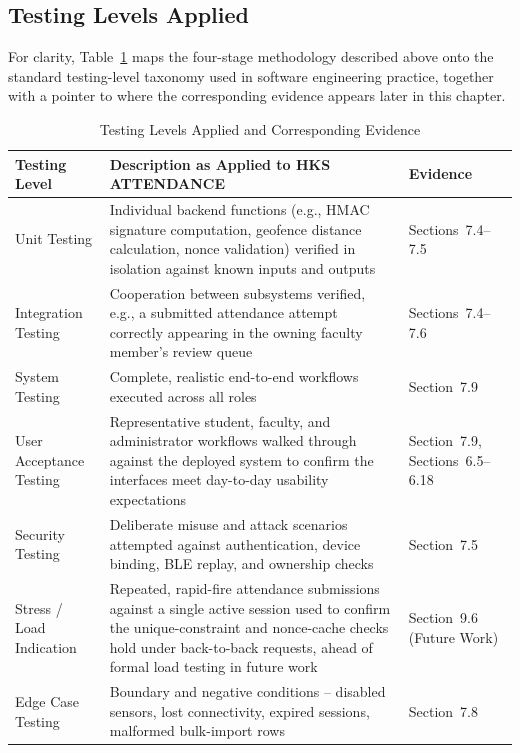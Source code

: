 \documentclass[12pt, a4paper, oneside]{report}
\begin{document}
\subsection{Testing Levels Applied}
\label{sec:testing-levels}

For clarity, Table~\ref{tab:testing-levels} maps the four-stage methodology described above onto the standard testing-level taxonomy used in software engineering practice, together with a pointer to where the corresponding evidence appears later in this chapter.

\begin{table}[p]
\centering
\caption{Testing Levels Applied and Corresponding Evidence}
\label{tab:testing-levels}
\tiny
\setlength{\tabcolsep}{3pt}
\renewcommand{\arraystretch}{1.05}
\begin{tabularx}{\textwidth}{|p{2.6cm}|X|p{2.6cm}|}
\hline
\textbf{Testing Level} & \textbf{Description as Applied to HKS ATTENDANCE} & \textbf{Evidence} \\
\hline
Unit Testing & Individual backend functions (e.g., HMAC signature computation, geofence distance calculation, nonce validation) verified in isolation against known inputs and outputs & Sections~7.4--7.5 \\
\hline
Integration Testing & Cooperation between subsystems verified, e.g., a submitted attendance attempt correctly appearing in the owning faculty member's review queue & Sections~7.4--7.6 \\
\hline
System Testing & Complete, realistic end-to-end workflows executed across all roles & Section~7.9 \\
\hline
User Acceptance Testing & Representative student, faculty, and administrator workflows walked through against the deployed system to confirm the interfaces meet day-to-day usability expectations & Section~7.9, Sections~6.5--6.18 \\
\hline
Security Testing & Deliberate misuse and attack scenarios attempted against authentication, device binding, BLE replay, and ownership checks & Section~7.5 \\
\hline
Stress / Load Indication & Repeated, rapid-fire attendance submissions against a single active session used to confirm the unique-constraint and nonce-cache checks hold under back-to-back requests, ahead of formal load testing in future work & Section~9.6 (Future Work) \\
\hline
Edge Case Testing & Boundary and negative conditions -- disabled sensors, lost connectivity, expired sessions, malformed bulk-import rows & Section~7.8 \\
\hline
\end{tabularx}
\end{table}
\end{document}
